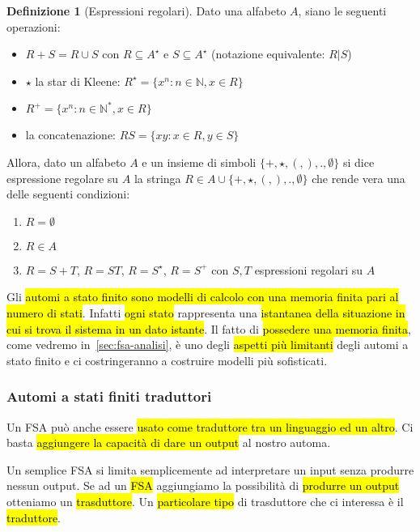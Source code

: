 \documentclass[a4paper,11pt,oneside]{article}
\theoremstyle{plain}
\theoremstyle{definition}
\newtheorem{defn}{Definizione}[section]
\theoremstyle{remark}
\begin{document}
\begin{defn}[Espressioni regolari]\label{def:regex}
  Dato una alfabeto $A$, siano le seguenti operazioni:

  \begin{itemize}
    \item $R + S = R \cup S$ con $R \subseteq A^\star$ e $S \subseteq A^\star$
      (notazione equivalente: $R | S$)
    \item $\star$ la star di Kleene:
      $R^\star = \{x^n : n \in \mathbb{N}, x \in R\}$
    \item $R^+ = \{x^n : n \in \mathbb{N}^*, x \in R\}$
    \item la concatenazione: $RS = \{xy : x \in R, y \in S\}$
  \end{itemize}

  Allora, dato un alfabeto $A$ e un insieme di simboli
  $\{+,\star,(,),.,\emptyset\}$ si dice espressione regolare su $A$ la stringa
  $R \in A \cup \{+,\star,(,),.,\emptyset\}$ che rende vera una delle seguenti
  condizioni:

  \begin{enumerate}
    \item $R = \emptyset$
    \item $R \in A$
    \item $R = S + T$, $R = ST$, $R = S^\star$, $R = S^+$ con $S,T$ espressioni
      regolari su $A$
  \end{enumerate}
\end{defn}

Gli \hl{automi a stato finito sono modelli di calcolo con una memoria finita
pari al numero di stati}. Infatti \hl{ogni stato} rappresenta una \hl{istantanea
della situazione in cui si trova il sistema in un dato istante}. Il fatto di
\hl{possedere una memoria finita}, come vedremo in~\ref{sec:fsa-analisi}, è uno
degli \hl{aspetti più limitanti} degli automi a stato finito e ci costringeranno
a costruire modelli più sofisticati.

\subsubsection{Automi a stati finiti traduttori}\label{sec:fsa-trad}

Un FSA può anche essere \hl{usato come traduttore tra un linguaggio ed un
altro}. Ci basta \hl{aggiungere la capacità di dare un output} al nostro automa.

Un semplice FSA si limita semplicemente ad interpretare un input senza produrre
nessun output. Se ad un \hl{FSA} aggiungiamo la possibilità di \hl{produrre un
output} otteniamo un \hl{trasduttore}. Un \hl{particolare tipo} di trasduttore
che ci interessa è il \hl{traduttore}.
\end{document}
